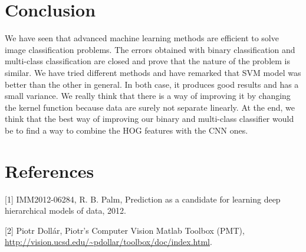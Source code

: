 \documentclass{article} %
\begin{document}
\section{Conclusion}

We have seen that advanced machine learning methods are efficient to solve image classification problems. The errors obtained with binary classification and multi-class classification are closed and prove that the nature of the problem is similar. We have tried different methods and have remarked that SVM model was better than the other in general. In both case, it produces good results and has a small variance. We really think that there is a way of improving it by changing the kernel function because data are surely not separate linearly. At the end, we think that the best way of improving our binary and multi-class classifier would be to find a way to combine the HOG features with the CNN ones.

\section{References}

[1]    IMM2012-06284, R. B. Palm, Prediction as a candidate for learning deep hierarchical models of data, 2012.

[2]   Piotr Doll\'ar, {P}iotr's {C}omputer {V}ision {M}atlab {T}oolbox ({PMT}), \url{http://vision.ucsd.edu/~pdollar/toolbox/doc/index.html}. 
\end{document}
